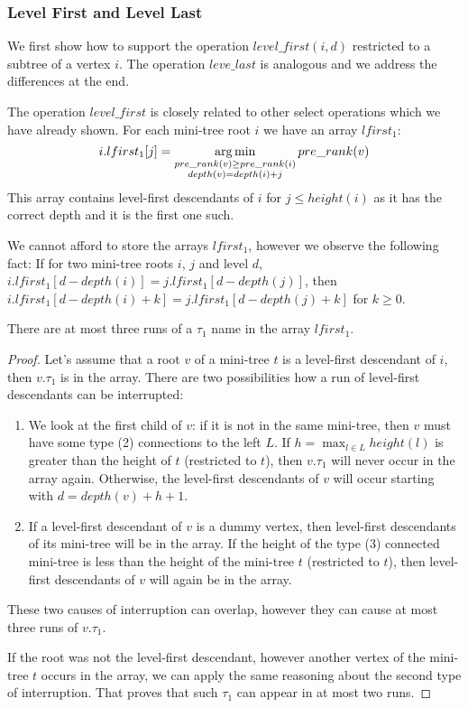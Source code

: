 \subsubsection{Level First and Level Last}

We first show how to support the operation $level\_first(i, d)$ restricted to a subtree of a vertex $i$.
The operation $leve\_last$ is analogous and we address the differences at the end.

The operation $level\_first$ is closely related to other select operations which we have already shown.
For each mini-tree root $i$ we have an array $lfirst_1$:
$$ i.lfirst_1[j] = \operatorname*{arg\,min}_{\substack{pre\_rank(v) \ge pre\_rank(i) \\ depth(v) = depth(i) + j}} pre\_rank(v) $$
This array contains level-first descendants of $i$ for $j \le height(i)$ as it has the correct depth and it is the first one such.

We cannot afford to store the arrays $lfirst_1$, however we observe the following fact:
If for two mini-tree roots $i$, $j$ and level $d$, $i.lfirst_1[d - depth(i)] = j.lfirst_1[d - depth(j)]$, then $i.lfirst_1[d - depth(i) + k] = j.lfirst_1[d - depth(j) + k]$ for $k \ge 0$.

\begin{lemma}\label{l:level-first-3}
	There are at most three runs of a $\tau_1$ name in the array $lfirst_1$.
\end{lemma}
\begin{proof}
	Let's assume that a root $v$ of a mini-tree $t$ is a level-first descendant of $i$, then $v.\tau_1$ is in the array.
	There are two possibilities how a run of level-first descendants can be interrupted:
	\begin{enumerate}
		\item We look at the first child of $v$: if it is not in the same mini-tree, then $v$ must have some type (2) connections to the left $L$.
		If $h = \max_{l \in L} height(l)$ is greater than the height of $t$ (restricted to $t$), then $v.\tau_1$ will never occur in the array again.
		Otherwise, the level-first descendants of $v$ will occur starting with $d = depth(v) + h + 1$.
		\item If a level-first descendant of $v$ is a dummy vertex, then level-first descendants of its mini-tree will be in the array.
		If the height of the type (3) connected mini-tree is less than the height of the mini-tree $t$ (restricted to $t$), then level-first descendants of $v$ will again be in the array.
	\end{enumerate}
	These two causes of interruption can overlap, however they can cause at most three runs of $v.\tau_1$.
	
	If the root was not the level-first descendant, however another vertex of the mini-tree $t$ occurs in the array, we can apply the same reasoning about the second type of interruption.
	That proves that such $\tau_1$ can appear in at most two runs.
\end{proof}

